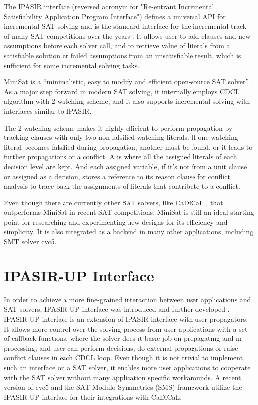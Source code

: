 The IPASIR interface (reversed acronym for "Re-entrant Incremental Satisfiability Application Program Interface") defines a universal API for incremental SAT solving and is the standard interface for the incremental track of many SAT competitions over the years \cite{BALYO201645}. It allows user to add clauses and new assumptions before each solver call, and to retrieve value of literals from a satisfiable solution or failed assumptions from an unsatisfiable result, which is sufficient for some incremental solving tasks.

MiniSat is a ``minimalistic, easy to modify and efficient open-source SAT solver'' \cite{10.1007/978-3-540-24605-3_37}. As a major step forward in modern SAT solving, it internally employs CDCL algorithm with 2-watching scheme, and it also supports incremental solving with interfaces similar to IPASIR.

The 2-watching scheme makes it highly efficient to perform propagation by tracking clauses with only two non-falsified watching literals. If one watching literal becomes falsified during propagation, another must be found, or it leads to further propagations or a conflict. A  is where all the assigned literals of each decision level are kept. And each assigned variable, if it's not from a unit clause or assigned as a decision, stores a reference to its reason clause for conflict analysis to trace back the assignments of literals that contribute to a conflict.

Even though there are currently other SAT solvers, like CaDiCaL \cite{BiereFallerFazekasFleuryFroleyks-CAV24}, that outperforms MiniSat in recent SAT competitions. MiniSat is still an ideal starting point for researching and experimenting new designs for its efficiency and simplicity. It is also integrated as a backend in many other applications, including SMT solver cvc5.

\section{IPASIR-UP Interface}

In order to achieve a more fine-grained interaction between user applications and SAT solvers, IPASIR-UP interface was introduced \cite{fazekas_et_al:LIPIcs.SAT.2023.8} and further developed \cite{FazekasNiemetzPreinerKirchwegerSzeiderBiere-JAIR24}. IPASIR-UP interface is an extension of IPASIR interface with user propagators. It allows more control over the solving process from user applications with a set of callback functions, where the solver does it basic job on propagating and in-processing, and user can perform decisions, do external propagations or raise conflict clauses in each CDCL loop. Even though it is not trivial to implement such an interface on a SAT solver, it enables more user applications to cooperate with the SAT solver without many application specific workarounds. A recent version of cvc5 and the SAT Modulo Symmetries (SMS) framework utilize the IPASIR-UP interface for their integrations with CaDiCaL.

